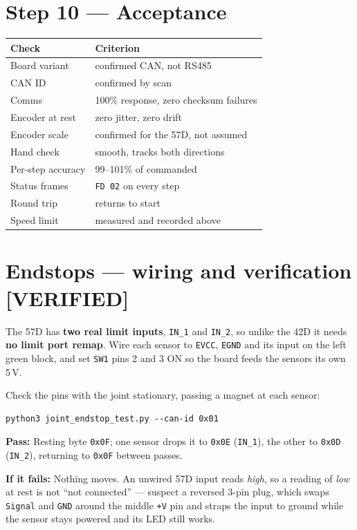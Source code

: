 \documentclass[11pt,letterpaper]{article}
\newcommand{\verified}{{\color{okgreen}\textbf{[VERIFIED]}}}
\newcommand{\passif}[1]{\par\vspace{2pt}\noindent\textbf{\color{okgreen}Pass:} #1\par\vspace{4pt}}
\newcommand{\failif}[1]{\noindent\textbf{If it fails:} #1\par\vspace{6pt}}
\begin{document}
\section*{Step 10 --- Acceptance}

\begin{center}
\begin{tabular}{ll}
\toprule
\textbf{Check} & \textbf{Criterion} \\ \midrule
Board variant     & confirmed CAN, not RS485 \\
CAN ID            & confirmed by scan \\
Comms             & 100\% response, zero checksum failures \\
Encoder at rest   & zero jitter, zero drift \\
Encoder scale     & confirmed for the 57D, not assumed \\
Hand check        & smooth, tracks both directions \\
Per-step accuracy & 99--101\% of commanded \\
Status frames     & \texttt{FD 02} on every step \\
Round trip        & returns to start \\
Speed limit       & measured and recorded above \\
\bottomrule
\end{tabular}
\end{center}

\section*{Endstops --- wiring and verification \verified}

The 57D has \textbf{two real limit inputs}, \texttt{IN\_1} and \texttt{IN\_2}, so
unlike the 42D it needs \textbf{no limit port remap}. Wire each sensor to
\texttt{EVCC}, \texttt{EGND} and its input on the left green block, and set
\texttt{SW1} pins 2 and 3 ON so the board feeds the sensors its own 5\,V.

Check the pins with the joint stationary, passing a magnet at each sensor:

\begin{lstlisting}
python3 joint_endstop_test.py --can-id 0x01
\end{lstlisting}

\passif{Resting byte \texttt{0x0F}; one sensor drops it to \texttt{0x0E}
(\texttt{IN\_1}), the other to \texttt{0x0D} (\texttt{IN\_2}), returning to
\texttt{0x0F} between passes.}
\failif{Nothing moves. An unwired 57D input reads \emph{high}, so a reading of
\emph{low} at rest is not ``not connected'' --- suspect a reversed 3-pin plug,
which swaps \texttt{Signal} and \texttt{GND} around the middle \texttt{+V} pin
and straps the input to ground while the sensor stays powered and its LED still
works.}
\end{document}
